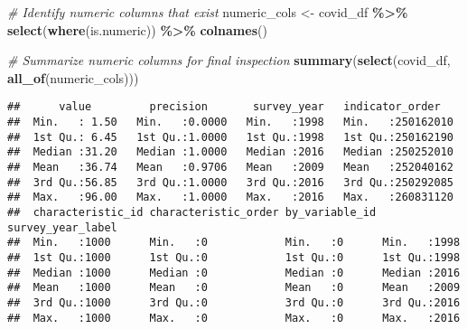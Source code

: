 \documentclass[
]{article}
\newenvironment{Shaded}{\begin{snugshade}}{\end{snugshade}}
\newcommand{\CommentTok}[1]{\textcolor[rgb]{0.56,0.35,0.01}{\textit{#1}}}
\newcommand{\FunctionTok}[1]{\textcolor[rgb]{0.13,0.29,0.53}{\textbf{#1}}}
\newcommand{\NormalTok}[1]{#1}
\newcommand{\OtherTok}[1]{\textcolor[rgb]{0.56,0.35,0.01}{#1}}
\newcommand{\SpecialCharTok}[1]{\textcolor[rgb]{0.81,0.36,0.00}{\textbf{#1}}}
\begin{document}
\begin{Shaded}
\begin{Highlighting}[]
\CommentTok{\# Identify numeric columns that exist}
\NormalTok{numeric\_cols }\OtherTok{\textless{}{-}}\NormalTok{ covid\_df }\SpecialCharTok{\%\textgreater{}\%} \FunctionTok{select}\NormalTok{(}\FunctionTok{where}\NormalTok{(is.numeric)) }\SpecialCharTok{\%\textgreater{}\%} \FunctionTok{colnames}\NormalTok{()}

\CommentTok{\# Summarize numeric columns for final inspection}
\FunctionTok{summary}\NormalTok{(}\FunctionTok{select}\NormalTok{(covid\_df, }\FunctionTok{all\_of}\NormalTok{(numeric\_cols)))}
\end{Highlighting}
\end{Shaded}

\begin{verbatim}
##      value         precision       survey_year   indicator_order    
##  Min.   : 1.50   Min.   :0.0000   Min.   :1998   Min.   :250162010  
##  1st Qu.: 6.45   1st Qu.:1.0000   1st Qu.:1998   1st Qu.:250162190  
##  Median :31.20   Median :1.0000   Median :2016   Median :250252010  
##  Mean   :36.74   Mean   :0.9706   Mean   :2009   Mean   :252040162  
##  3rd Qu.:56.85   3rd Qu.:1.0000   3rd Qu.:2016   3rd Qu.:250292085  
##  Max.   :96.00   Max.   :1.0000   Max.   :2016   Max.   :260831120  
##  characteristic_id characteristic_order by_variable_id survey_year_label
##  Min.   :1000      Min.   :0            Min.   :0      Min.   :1998     
##  1st Qu.:1000      1st Qu.:0            1st Qu.:0      1st Qu.:1998     
##  Median :1000      Median :0            Median :0      Median :2016     
##  Mean   :1000      Mean   :0            Mean   :0      Mean   :2009     
##  3rd Qu.:1000      3rd Qu.:0            3rd Qu.:0      3rd Qu.:2016     
##  Max.   :1000      Max.   :0            Max.   :0      Max.   :2016
\end{verbatim}
\end{document}
